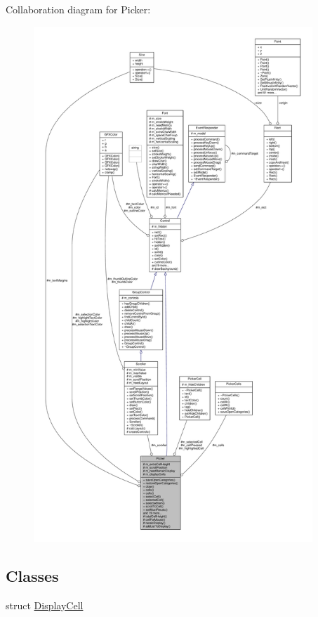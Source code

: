 Collaboration diagram for Picker\+:
\nopagebreak
\begin{figure}[H]
\begin{center}
\leavevmode
\includegraphics[height=550pt]{d4/d79/classPicker__coll__graph}
\end{center}
\end{figure}
\subsection*{Classes}
\begin{DoxyCompactItemize}
\item 
struct \hyperlink{structPicker_1_1DisplayCell}{Display\+Cell}
\end{DoxyCompactItemize}
